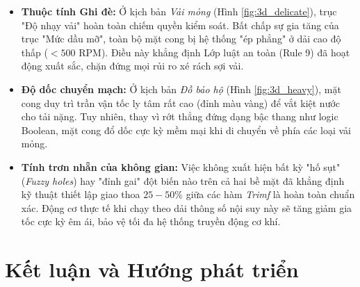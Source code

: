 \documentclass[12pt, a4paper]{article}
\begin{document}
\begin{itemize}
    \item \textbf{Thuộc tính Ghi đè:} Ở kịch bản \textit{Vải mỏng} (Hình \ref{fig:3d_delicate}), trục "Độ nhạy vải" hoàn toàn chiếm quyền kiểm soát. Bất chấp sự gia tăng của trục "Mức dầu mỡ", toàn bộ mặt cong bị hệ thống "ép phẳng" ở dải cao độ thấp ($< 500$ RPM). Điều này khẳng định Lớp luật an toàn (Rule 9) đã hoạt động xuất sắc, chặn đứng mọi rủi ro xé rách sợi vải.
    \item \textbf{Độ dốc chuyển mạch:} Ở kịch bản \textit{Đồ bảo hộ} (Hình \ref{fig:3d_heavy}), mặt cong duy trì trần vận tốc ly tâm rất cao (đỉnh màu vàng) để vắt kiệt nước cho tải nặng. Tuy nhiên, thay vì rớt thẳng đứng dạng bậc thang như logic Boolean, mặt cong đổ dốc cực kỳ mềm mại khi di chuyển về phía các loại vải mỏng. 
    \item \textbf{Tính trơn nhẵn của không gian:} Việc không xuất hiện bất kỳ "hố sụt" (\textit{Fuzzy holes}) hay "đỉnh gai" đột biến nào trên cả hai bề mặt đã khẳng định kỹ thuật thiết lập giao thoa $25-50\%$ giữa các hàm \textit{Trimf} là hoàn toàn chuẩn xác. Động cơ thực tế khi chạy theo dải thông số nội suy này sẽ tăng giảm gia tốc cực kỳ êm ái, bảo vệ tối đa hệ thống truyền động cơ khí.
\end{itemize}
\section{Kết luận và Hướng phát triển}
\end{document}
